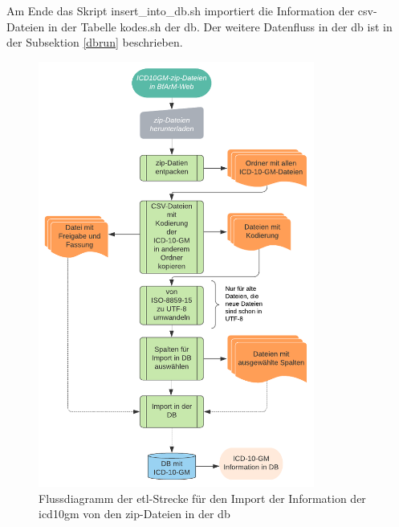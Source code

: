 Am Ende das Skript {\ttfamily insert\_into\_db.sh} importiert die Information der \ac{csv}-Dateien in der Tabelle {\ttfamily kodes.sh} der \ac{db}. Der weitere Datenfluss in der \ac{db} ist in der Subsektion \ref{dbrun} beschrieben.
\newpage
	\begin{figure}[ht]
		\centering
		\includegraphics[height=14cm]{figures/etl}
		\caption[\acs{etl}-Strecke]{Flussdiagramm der \acs{etl}-Strecke für den Import der Information der \ac{icd10gm} von den \ac{zip}-Dateien in der \ac{db} }
		\label{fig:etl}
	\end{figure} 
	